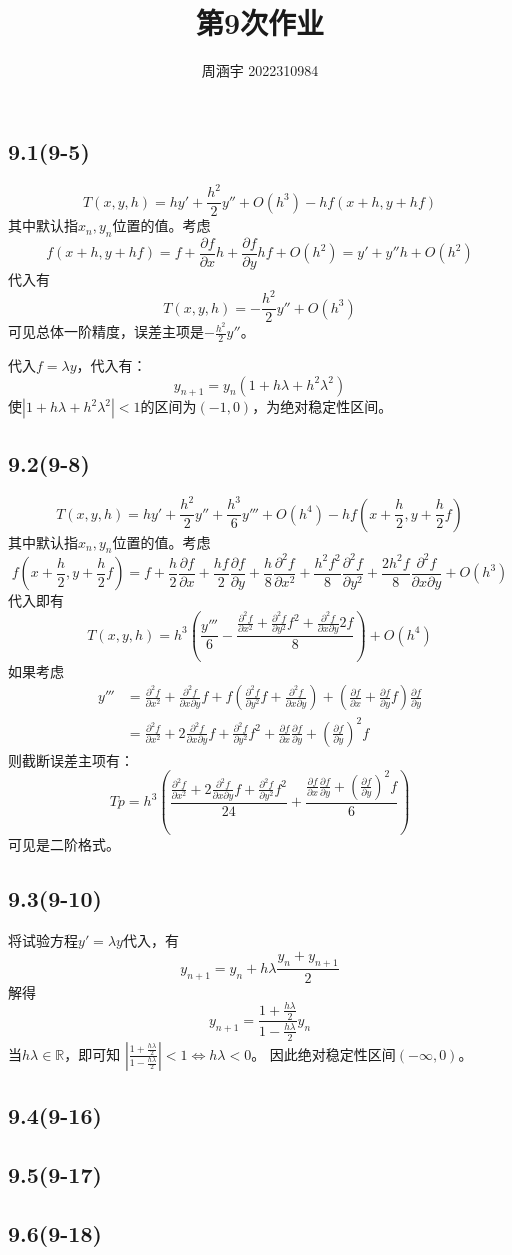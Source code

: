 \documentclass[UTF8,zihao=5]{ctexart}
\title{{\bfseries 第9次作业}}
\author{周涵宇 2022310984}
\date{}
\newcommand*{\pd}[2]{\frac{\partial #1}{\partial #2}}
\newcommand*{\pdcd}[3]
{\frac{\partial^2 #1}{\partial #2 \partial #3}}
\begin{document}
\maketitle

\subsection*{9.1(9-5)}

$$
T(x,y,h) = hy' + \frac{h^2}{2}y'' + O(h^3) - hf(x+h,y+hf)
$$
其中默认指$x_n,y_n$位置的值。考虑
$$
f(x+h,y+hf)=f+\pd{f}{x}h+\pd{f}{y}hf+O(h^2)
=y'+y''h+O(h^2)
$$
代入有
$$
T(x,y,h) = -\frac{h^2}{2}y'' + O(h^3)
$$
可见总体一阶精度，误差主项是$-\frac{h^2}{2}y''$。

代入$f=\lambda y$，代入有：
$$
y_{n+1}=y_n(1+h\lambda+h^2\lambda^2)
$$
使$|1+h\lambda+h^2\lambda^2|<1$的区间为$(-1,0)$，为绝对稳定性区间。

\subsection*{9.2(9-8)}

$$
T(x,y,h) = hy' + \frac{h^2}{2}y'' + \frac{h^3}{6}y''' + O(h^4)
-hf(x+\frac{h}{2},y+\frac{h}{2}f)
$$
其中默认指$x_n,y_n$位置的值。考虑
$$
f(x+\frac{h}{2},y+\frac{h}{2}f)=
f
+\frac{h}{2}\pd{f}{x}
+\frac{hf}{2}\pd{f}{y}
+\frac{h}{8}\pd{^2f}{x^2}
+\frac{h^2f^2}{8}\pd{^2f}{y^2}
+\frac{2h^2f}{8}\pdcd{f}{x}{y}
+O(h^3)
$$
代入即有
$$
T(x,y,h)
=
h^3\left(
    \frac{y'''}{6}-\frac{\pd{^2f}{x^2}+\pd{^2f}{y^2}f^2+\pdcd{f}{x}{y}2f}{8}
    \right)
    +O(h^4)
$$
如果考虑
$$
\begin{aligned}
    y'''& =\pd{^2f}{x^2}+\pdcd{f}{x}{y}f+
    f\left(
        \pd{^2f}{y^2}f+\pdcd{f}{x}{y}
    \right)
    +
    \left(
        \pd{f}{x}+\pd{f}{y}f
    \right)\pd{f}{y}\\
    & = \pd{^2f}{x^2} + 2\pdcd{f}{x}{y}f + \pd{^2f}{y^2}f^2
    +\pd{f}{x}\pd{f}{y}+\left(\pd{f}{y}\right)^2f
\end{aligned}
$$
则截断误差主项有：
$$
Tp = h^3\left(
    \frac{
        \pd{^2f}{x^2} + 2\pdcd{f}{x}{y}f + \pd{^2f}{y^2}f^2}{24}
    +\frac{
        \pd{f}{x}\pd{f}{y}+\left(\pd{f}{y}\right)^2f}{6}
    \right)
$$
可见是二阶格式。

\subsection*{9.3(9-10)}

将试验方程$y'=\lambda y$代入，有
$$
y_{n+1}=y_n+h\lambda\frac{y_n+y_{n+1}}{2}
$$
解得
$$
y_{n+1}=\frac{1+\frac{h\lambda}{2}}{1-\frac{h\lambda}{2}}y_n
$$
当$h\lambda\in\mathbb{R}$，即可知
$\left|\frac{1+\frac{h\lambda}{2}}{1-\frac{h\lambda}{2}}\right|<1\Leftrightarrow h\lambda<0$。
因此绝对稳定性区间$(-\infty,0)$。

\subsection*{9.4(9-16)}

\subsection*{9.5(9-17)}

\subsection*{9.6(9-18)}
\end{document}
